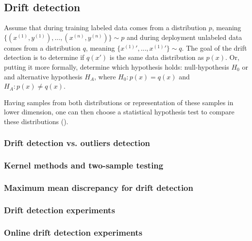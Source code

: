 \subsection{Drift detection}
    Assume that during training labeled data comes from a distribution $p$, meaning $\{(x^{(1)}, y^{(1)}), ..., (x^{(n)}, y^{(n)})\} \sim p$ and during deployment unlabeled data comes from a distribution $q$, meaning $\{x^{(1)}\prime, ..., x^{(1)}\prime\} \sim q$. The goal of the drift detection is to determine if $q(x\prime)$ is the same data distribution as $p(x)$. Or, putting it more formally, determine which hypothesis holds: null-hypothesis $H_0$ or and alternative hypothesis $H_A$, where $H_0:p(x) = q(x)$ and $H_A:p(x) \neq q(x)$.

    Having samples from both distributions or representation of these samples in lower dimension, one can then choose a statistical hypothesis test to compare these distributions (\cite{Muandet_2017}).
    \subsubsection{Drift detection vs. outliers detection}
        
    \subsubsection{Kernel methods and two-sample testing}
        
    \subsubsection{Maximum mean discrepancy for drift detection}
        
    \subsubsection{Drift detection experiments}
        
    \subsubsection{Online drift detection experiments}
            
